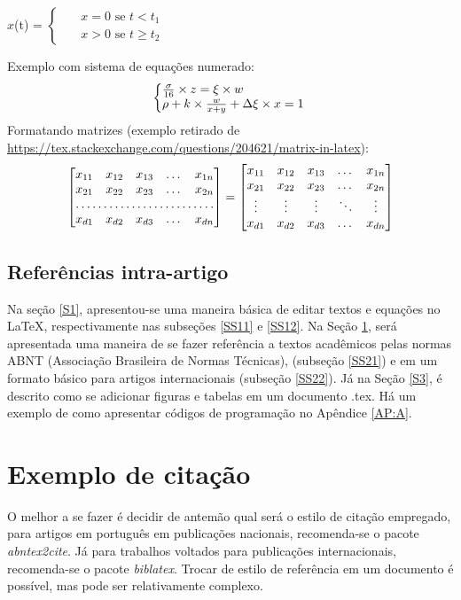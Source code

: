 \documentclass[a4paper]{article} %
\begin{document}
{\begin{center} $x$(t) = $\begin{cases}
			& \text{ $x = 0$ se } t < t_{1}\\ 
			& \text{ $x >  0$ se } t\geq t_{2} 
		\end{cases}$ \par \end{center}
Exemplo com sistema de equações numerado:
\begin{equation}
	\left\{\begin{array}{@{}l@{}}
		\frac{\sigma}{16} \times z = \xi \times w\\
		\rho + k \times \frac{w}{x+y} + \Delta \xi \times x=1
	\end{array}\right.\,
\end{equation}
Formatando matrizes (exemplo retirado de \url{https://tex.stackexchange.com/questions/204621/matrix-in-latex}): \\
\[
\begin{bmatrix}
	x_{11}       & x_{12} & x_{13} & \dots & x_{1n} \\
	x_{21}       & x_{22} & x_{23} & \dots & x_{2n} \\
	\hdotsfor{5} \\
	x_{d1}       & x_{d2} & x_{d3} & \dots & x_{dn}
\end{bmatrix}
=
\begin{bmatrix}
	x_{11} & x_{12} & x_{13} & \dots  & x_{1n} \\
	x_{21} & x_{22} & x_{23} & \dots  & x_{2n} \\
	\vdots & \vdots & \vdots & \ddots & \vdots \\
	x_{d1} & x_{d2} & x_{d3} & \dots  & x_{dn}
\end{bmatrix}
\]
\subsection{Referências intra-artigo} \label{SS13}
Na seção \ref{S1}, apresentou-se uma maneira básica de editar textos e equações no \LaTeX, respectivamente nas subseções \ref{SS11} e \ref{SS12}. Na Seção \ref{S2}, será apresentada uma maneira de se fazer referência a textos acadêmicos pelas normas ABNT (Associação Brasileira de Normas Técnicas), (subseção \ref{SS21}) e em um formato básico para artigos internacionais (subseção \ref{SS22}). Já na Seção \ref{S3}, é descrito como se adicionar figuras e tabelas em um documento .tex. Há um exemplo de como apresentar códigos de programação no Apêndice \ref{AP:A}.
\section{Exemplo de citação} \label{S2} %
O melhor a se fazer é decidir de antemão qual será o estilo de citação empregado, para artigos em português em publicações nacionais, recomenda-se o pacote \textit{abntex2cite}. Já para trabalhos voltados para publicações internacionais, recomenda-se o pacote \textit{biblatex}. Trocar de estilo de referência em um documento é possível, mas pode ser relativamente complexo.
}
\end{document}
